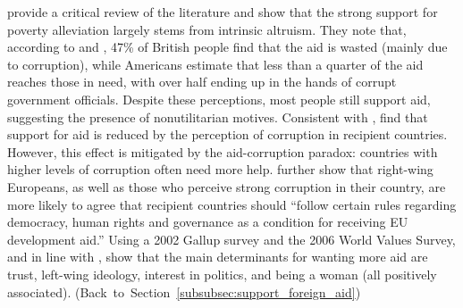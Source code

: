  provide a critical review of the literature and show that the strong support for poverty alleviation largely stems from intrinsic altruism. They note that, according to  and , 47\% of British people find that the aid is wasted (mainly due to corruption), while Americans estimate that less than a quarter of the aid reaches those in need, with over half ending up in the hands of corrupt government officials. Despite these perceptions, most people still support aid, suggesting the presence of nonutilitarian motives. Consistent with ,  find that support for aid is reduced by the perception of corruption in recipient countries. However, this effect is mitigated by the aid-corruption paradox: countries with higher levels of corruption often need more help. %
 further show that right-wing Europeans, as well as those who perceive strong corruption in their country, are more likely to agree that recipient countries should ``follow certain rules regarding democracy, human rights and governance as a condition for receiving EU development aid.'' 
Using a 2002 Gallup survey and the 2006 World Values Survey, and in line with ,  show that the main determinants for wanting more aid are trust, left-wing ideology, interest in politics, and being a woman (all positively associated).  \hfill (Back~to~Section~\ref{subsubsec:support_foreign_aid}) %

